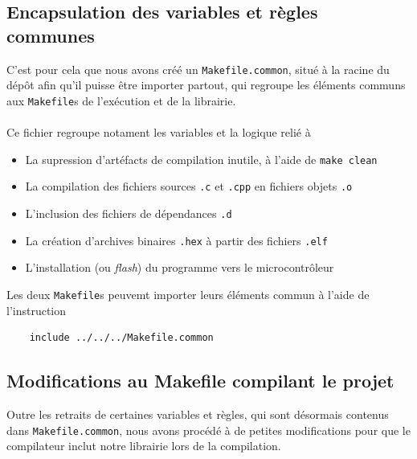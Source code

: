 \documentclass[12pt]{scrartcl}
\begin{document}
\subsection{Encapsulation des variables et règles communes}
C'est pour cela que nous avons créé un \verb|Makefile.common|, situé à la racine
du dépôt afin qu'il puisse être importer partout, qui regroupe les éléments communs
aux \verb|Makefile|s de l'exécution et de la librairie.
\\ \\
Ce fichier regroupe notament les variables et la logique relié à
\begin{itemize}
    \item La supression d'artéfacts de compilation inutile, à l'aide de \verb|make clean|
    \item La compilation des fichiers sources \verb|.c| et \verb|.cpp| en fichiers
          objets \verb|.o|
    \item L'inclusion des fichiers de dépendances \verb|.d|
    \item La création d'archives binaires \verb|.hex| à partir des fichiers
          \verb|.elf|
    \item L'installation (ou \textit{flash}) du programme vers le
          microcontrôleur
\end{itemize}

Les deux \verb|Makefile|s peuvemt importer leurs éléments commun à l'aide de l'instruction

\begin{verbatim}
    include ../../../Makefile.common
\end{verbatim}

\subsection{Modifications au Makefile compilant le projet}
Outre les retraits de certaines variables et règles, qui sont désormais contenus
dans \verb|Makefile.common|, nous avons procédé à de petites modifications pour
que le compilateur inclut notre librairie lors de la compilation.
\end{document}
